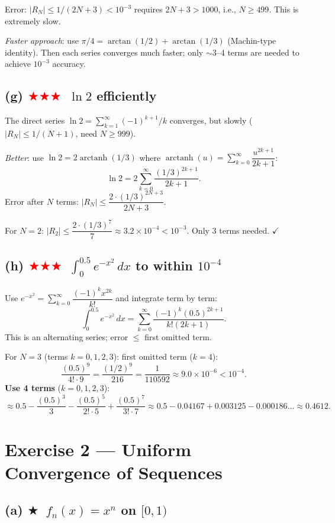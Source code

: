 \documentclass[12pt,a4paper]{article}
\newcommand{\easy}{\textcolor{green!60!black}{$\bigstar$}}
\newcommand{\hard}{\textcolor{red}{$\bigstar\bigstar\bigstar$}}
\begin{document}
Error: $|R_N|\leq 1/(2N+3)<10^{-3}$ requires $2N+3>1000$, i.e., $N\geq499$. This is extremely slow.

\textit{Faster approach}: use $\pi/4=\arctan(1/2)+\arctan(1/3)$ (Machin-type identity).  Then each series converges much faster; only $\sim 3$–$4$ terms are needed to achieve $10^{-3}$ accuracy.

\subsection*{(g) \hard\ $\ln 2$ efficiently}

The direct series $\ln 2=\sum_{k=1}^{\infty}(-1)^{k+1}/k$ converges, but slowly ($|R_N|\leq 1/(N+1)$, need $N\geq999$).

\textit{Better}: use $\ln 2 = 2\operatorname{arctanh}(1/3)$ where $\operatorname{arctanh}(u)=\sum_{k=0}^{\infty}\dfrac{u^{2k+1}}{2k+1}$:
\[
  \ln 2 = 2\sum_{k=0}^{\infty}\frac{(1/3)^{2k+1}}{2k+1}.
\]
Error after $N$ terms: $|R_N|\leq \dfrac{2\cdot(1/3)^{2N+3}}{2N+3}$.

For $N=2$: $|R_2|\leq \dfrac{2\cdot(1/3)^7}{7}\approx 3.2\times10^{-4}<10^{-3}$.  Only 3 terms needed. $\checkmark$

\subsection*{(h) \hard\ $\displaystyle\int_0^{0.5}e^{-x^2}\,dx$ to within $10^{-4}$}

Use $e^{-x^2}=\sum_{k=0}^{\infty}\dfrac{(-1)^k x^{2k}}{k!}$ and integrate term by term:
\[
  \int_0^{0.5}e^{-x^2}\,dx = \sum_{k=0}^{\infty}\frac{(-1)^k (0.5)^{2k+1}}{k!(2k+1)}.
\]
This is an alternating series; error $\leq$ first omitted term.

For $N=3$ (terms $k=0,1,2,3$): first omitted term ($k=4$):
\[
  \frac{(0.5)^9}{4!\cdot 9} = \frac{(1/2)^9}{216} = \frac{1}{110592}\approx 9.0\times10^{-6}<10^{-4}.
\]
\textbf{Use 4 terms} ($k=0,1,2,3$):
\[
  \approx 0.5 - \frac{(0.5)^3}{3} - \frac{(0.5)^5}{2!\cdot5} + \frac{(0.5)^7}{3!\cdot7}
  \approx 0.5 - 0.04167 + 0.003125 - 0.000186\ldots
  \approx \mathbf{0.4612}.
\]

\section*{Exercise 2 — Uniform Convergence of Sequences}

\subsection*{(a) \easy\ $f_n(x)=x^n$ on $[0,1)$}
\end{document}
